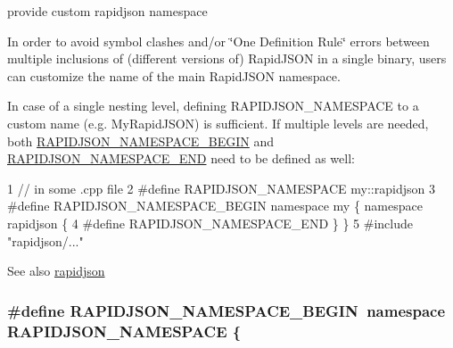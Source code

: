 provide custom rapidjson namespace 

In order to avoid symbol clashes and/or \char`\"{}\+One Definition Rule\char`\"{} errors between multiple inclusions of (different versions of) Rapid\+J\+S\+ON in a single binary, users can customize the name of the main Rapid\+J\+S\+ON namespace.

In case of a single nesting level, defining {\ttfamily R\+A\+P\+I\+D\+J\+S\+O\+N\+\_\+\+N\+A\+M\+E\+S\+P\+A\+CE} to a custom name (e.\+g. {\ttfamily My\+Rapid\+J\+S\+ON}) is sufficient. If multiple levels are needed, both \hyperlink{group__RAPIDJSON__CONFIG_gad3806c8251fdc7da9618b7e922674ffc}{R\+A\+P\+I\+D\+J\+S\+O\+N\+\_\+\+N\+A\+M\+E\+S\+P\+A\+C\+E\+\_\+\+B\+E\+G\+IN} and \hyperlink{group__RAPIDJSON__CONFIG_gaf18f052a98b9f5df5448d39484b743c1}{R\+A\+P\+I\+D\+J\+S\+O\+N\+\_\+\+N\+A\+M\+E\+S\+P\+A\+C\+E\+\_\+\+E\+ND} need to be defined as well\+:


\begin{DoxyCode}
1 // in some .cpp file
2 #define RAPIDJSON\_NAMESPACE my::rapidjson
3 #define RAPIDJSON\_NAMESPACE\_BEGIN namespace my \{ namespace rapidjson \{
4 #define RAPIDJSON\_NAMESPACE\_END   \} \}
5 #include "rapidjson/..."
\end{DoxyCode}


\begin{DoxySeeAlso}{See also}
\hyperlink{namespacerapidjson}{rapidjson} 
\end{DoxySeeAlso}
\subsubsection[{\texorpdfstring{R\+A\+P\+I\+D\+J\+S\+O\+N\+\_\+\+N\+A\+M\+E\+S\+P\+A\+C\+E\+\_\+\+B\+E\+G\+IN}{RAPIDJSON_NAMESPACE_BEGIN}}]{\setlength{\rightskip}{0pt plus 5cm}\#define R\+A\+P\+I\+D\+J\+S\+O\+N\+\_\+\+N\+A\+M\+E\+S\+P\+A\+C\+E\+\_\+\+B\+E\+G\+IN~namespace {\bf R\+A\+P\+I\+D\+J\+S\+O\+N\+\_\+\+N\+A\+M\+E\+S\+P\+A\+CE} \{}\hypertarget{group__RAPIDJSON__CONFIG_gad3806c8251fdc7da9618b7e922674ffc}{}\label{group__RAPIDJSON__CONFIG_gad3806c8251fdc7da9618b7e922674ffc}


